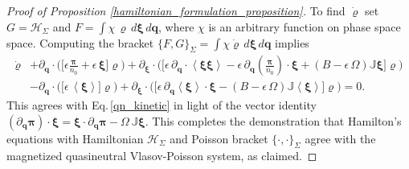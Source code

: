 \documentclass[%
 aip,
 amsmath,amssymb,
reprint, onecolumn %
]{revtex4-1}
\begin{document}
\begin{proof}[Proof of Proposition \ref{hamiltonian_formulation_proposition}]
To find $\dot{\varrho}$ set $G = \mathcal{H}_\Sigma$ and $F = \int \chi\,\varrho\,d\bm{\xi}\,d\bm{q}$, where $\chi$ is an arbitrary function on phase space space. Computing the bracket $\{F,G\}_\Sigma = \int \chi\dot{\varrho}\,d\bm{\xi}\,d\bm{q}$ implies
\begin{align*}
\dot{\varrho}&+ \partial_{\bm{q}}\cdot\bigg(\bigg[\epsilon\frac{\bm{\pi}}{n_0} + \epsilon\,\bm{\xi} \bigg]\varrho\bigg) + \partial_{\bm{\xi}}\cdot\bigg(\bigg[\epsilon\,\partial_{\bm{q}}\cdot\left\langle\bm{\xi}\bm{\xi}\right\rangle - \epsilon\,\partial_{\bm{q}}\left(\frac{\bm{\pi}}{n_0}\right)\cdot\bm{\xi} + (B-\epsilon\,\Omega)\mathbb{J}\bm{\xi}\bigg]\varrho\bigg)\\
& - \partial_{\bm{q}}\cdot\bigg(\bigg[ \epsilon\,\left\langle \bm{\xi}\right\rangle\bigg]\varrho\bigg) + \partial_{\bm{\xi}}\cdot\bigg(\bigg[\epsilon\,\partial_{\bm{q}}\left\langle\bm{\xi}\right\rangle \cdot\bm{\xi} - (B-\epsilon\,\Omega)\mathbb{J}\left\langle\bm{\xi}\right\rangle\bigg]\varrho\bigg) = 0.
\end{align*}
This agrees with Eq.\,\eqref{qn_kinetic} in light of the vector identity $(\partial_{\bm{q}}\bm{\pi})\cdot\bm{\xi} = \bm{\xi}\cdot\partial_{\bm{q}}\bm{\pi} - \Omega\,\mathbb{J}\bm{\xi}$. This completes the demonstration that Hamilton's equations with Hamiltonian $\mathcal{H}_\Sigma$ and Poisson bracket $\{\cdot,\cdot\}_\Sigma$ agree with the magnetized quasineutral Vlasov-Poisson system, as claimed.
\end{proof}
\end{document}
